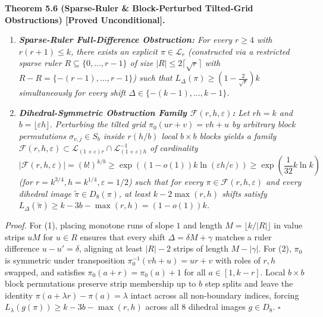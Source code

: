 \documentclass[
  11pt,
]{article}
\providecommand{\tightlist}{%
  \setlength{\itemsep}{0pt}\setlength{\parskip}{0pt}}
\begin{document}
\textbf{Theorem 5.6 (Sparse-Ruler \& Block-Perturbed Tilted-Grid Obstructions) [Proved Unconditional].}
\begin{enumerate}
\def\labelenumi{\arabic{enumi}.}
\tightlist
\item \emph{\textbf{Sparse-Ruler Full-Difference Obstruction:} For every \(r \ge 4\) with \(r(r+1) \le k\), there exists an explicit \(\pi \in \mathcal{L}_r\) (constructed via a restricted sparse ruler \(R \subseteq \{0, \dots, r-1\}\) of size \(|R| \le 2\lceil\sqrt{r}\rceil\) with \(R - R = \{-(r-1), \dots, r-1\}\)) such that \(L_\Delta(\pi) \ge \left(1 - \frac{2}{\sqrt{r}}\right)k\) simultaneously for \emph{every} shift \(\Delta \in \{-(k-1), \dots, k-1\}\).}
\item \emph{\textbf{Dihedral-Symmetric Obstruction Family \(\mathcal{F}(r, h, \varepsilon)\):} Let \(r h = k\) and \(b = \lfloor \varepsilon h \rfloor\). Perturbing the tilted grid \(\pi_0(u r + v) = v h + u\) by arbitrary block permutations \(\sigma_{v, j} \in S_b\) inside \(r(h/b)\) local \(b \times b\) blocks yields a family \(\mathcal{F}(r, h, \varepsilon) \subset \mathcal{L}_{(1+\varepsilon)r} \cap \mathcal{L}_{(1+\varepsilon)h}^{-1}\) of cardinality}
\begin{equation}
|\mathcal{F}(r, h, \varepsilon)| = (b!)^{k/b} \ge \exp\left( (1 - o(1)) k \ln(\varepsilon h / e) \right) \ge \exp\left( \frac{1}{32} k \ln k \right)
\end{equation}
\emph{(for \(r = k^{3/4}, h = k^{1/4}, \varepsilon = 1/2\)) such that for every \(\pi \in \mathcal{F}(r, h, \varepsilon)\) and \emph{every} dihedral image \(\tilde{\pi} \in D_8(\pi)\), at least \(k - 2\max(r, h)\) shifts satisfy \(L_\Delta(\tilde{\pi}) \ge k - 3b - \max(r, h) = (1 - o(1))k\).}
\end{enumerate}

\emph{Proof.} For (1), placing monotone runs of slope \(1\) and length \(M = \lfloor k/|R|\rfloor\) in value strips \(u M\) for \(u \in R\) ensures that every shift \(\Delta = \delta M + \gamma\) matches a ruler difference \(u - u' = \delta\), aligning at least \(|R| - 2\) strips of length \(M - |\gamma|\). For (2), \(\pi_0\) is symmetric under transposition \(\pi_0^{-1}(v h + u) = u r + v\) with roles of \(r, h\) swapped, and satisfies \(\pi_0(a + r) = \pi_0(a) + 1\) for all \(a \in [1, k-r]\). Local \(b \times b\) block permutations preserve strip membership up to \(b\) step splits and leave the identity \(\pi(a + \lambda r) - \pi(a) = \lambda\) intact across all non-boundary indices, forcing \(L_{\lambda}(g(\pi)) \ge k - 3b - \max(r, h)\) across all \(8\) dihedral images \(g \in D_8\). \(\square\)
\end{document}
